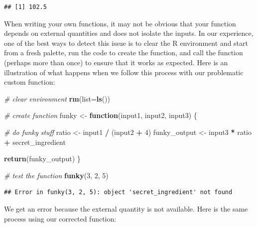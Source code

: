 \documentclass[
]{book}
\newenvironment{Shaded}{\begin{snugshade}}{\end{snugshade}}
\newcommand{\AttributeTok}[1]{\textcolor[rgb]{0.13,0.29,0.53}{#1}}
\newcommand{\CommentTok}[1]{\textcolor[rgb]{0.56,0.35,0.01}{\textit{#1}}}
\newcommand{\ControlFlowTok}[1]{\textcolor[rgb]{0.13,0.29,0.53}{\textbf{#1}}}
\newcommand{\DecValTok}[1]{\textcolor[rgb]{0.00,0.00,0.81}{#1}}
\newcommand{\FunctionTok}[1]{\textcolor[rgb]{0.13,0.29,0.53}{\textbf{#1}}}
\newcommand{\NormalTok}[1]{#1}
\newcommand{\OtherTok}[1]{\textcolor[rgb]{0.56,0.35,0.01}{#1}}
\newcommand{\SpecialCharTok}[1]{\textcolor[rgb]{0.81,0.36,0.00}{\textbf{#1}}}
\begin{document}
\begin{verbatim}
## [1] 102.5
\end{verbatim}

When writing your own functions, it may not be obvious that your function depends on external quantities and does not isolate the inputs.
In our experience, one of the best ways to detect this issue is to clear the R environment and start from a fresh palette, run the code to create the function, and call the function (perhaps more than once) to ensure that it works as expected.
Here is an illustration of what happens when we follow this process with our problematic custom function:

\begin{Shaded}
\begin{Highlighting}[]
\CommentTok{\# clear environment}
\FunctionTok{rm}\NormalTok{(}\AttributeTok{list=}\FunctionTok{ls}\NormalTok{()) }

\CommentTok{\# create function}
\NormalTok{funky }\OtherTok{\textless{}{-}} \ControlFlowTok{function}\NormalTok{(input1, input2, input3) \{}
  
  \CommentTok{\# do funky stuff}
\NormalTok{  ratio }\OtherTok{\textless{}{-}}\NormalTok{ input1 }\SpecialCharTok{/}\NormalTok{ (input2 }\SpecialCharTok{+} \DecValTok{4}\NormalTok{)}
\NormalTok{  funky\_output }\OtherTok{\textless{}{-}}\NormalTok{ input3 }\SpecialCharTok{*}\NormalTok{ ratio }\SpecialCharTok{+}\NormalTok{ secret\_ingredient}
  
  \FunctionTok{return}\NormalTok{(funky\_output)  }
\NormalTok{\}}

\CommentTok{\# test the function}
\FunctionTok{funky}\NormalTok{(}\DecValTok{3}\NormalTok{, }\DecValTok{2}\NormalTok{, }\DecValTok{5}\NormalTok{)}
\end{Highlighting}
\end{Shaded}

\begin{verbatim}
## Error in funky(3, 2, 5): object 'secret_ingredient' not found
\end{verbatim}

We get an error because the external quantity is not available.
Here is the same process using our corrected function:
\end{document}
